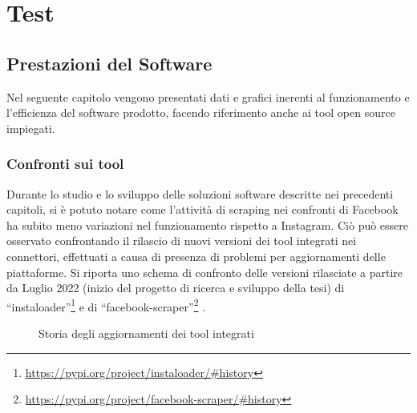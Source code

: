 \chapter{Test}\label{chap:test}
\section{Prestazioni del Software}
Nel seguente capitolo vengono presentati dati e grafici inerenti al funzionamento e l'efficienza del software prodotto, facendo riferimento anche ai tool open source impiegati.
\subsection{Confronti sui tool} \label{confronti_software}
Durante lo studio e lo sviluppo delle soluzioni software descritte nei precedenti capitoli, si \`e potuto notare come l'attivit\`a di scraping nei confronti di Facebook ha subito meno variazioni nel funzionamento rispetto a Instagram.
Ci\`o pu\`o essere osservato confrontando il rilascio di nuovi versioni dei tool integrati nei connettori, effettuati a causa di presenza di problemi per aggiornamenti delle piattaforme.
Si riporta uno schema di confronto delle versioni rilasciate a partire da Luglio 2022 (inizio del progetto di ricerca e sviluppo della tesi) di ``instaloader''\footnote{\url{https://pypi.org/project/instaloader/\#history}} e di ``facebook-scraper''\footnote{\url{https://pypi.org/project/facebook-scraper/\#history}} .

\begin{figure}[!htb]
  \begin{center}
  
  \caption{Storia degli aggiornamenti dei tool integrati}
\end{center}
\end{figure}
\newpage
